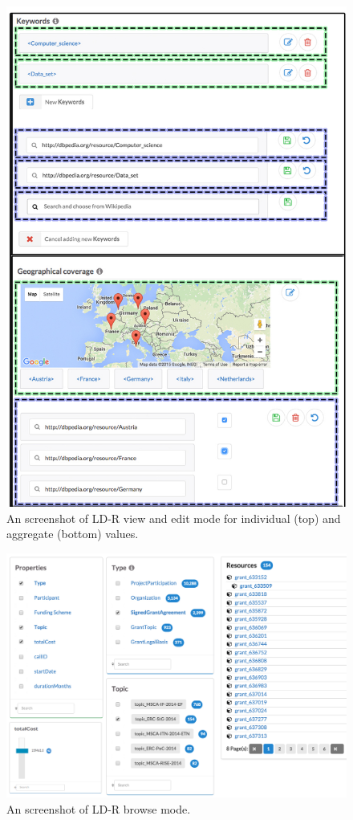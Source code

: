 \documentclass{acm_proc_article-sp}
\begin{document}
\begin{figure}[htb] 
  \includegraphics[width=1\linewidth]{images/viewedit.png}
  \caption{An screenshot of LD-R view and edit mode for individual (top) and aggregate (bottom) values.}
  \label{fig:ldrViewEdit}
\end{figure}

\begin{figure}[htb] 
  \includegraphics[width=1\linewidth]{images/facets.jpg}
  \caption{An screenshot of LD-R browse mode.}
  \label{fig:ldrBrowse}
\end{figure}
\end{document}
